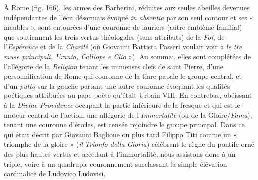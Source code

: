 \documentclass[12pt,twoside,openany]{book}
\begin{document}
À Rome (fig. 166), les armes des Barberini, réduites aux seules abeilles devenues indépendantes de l’écu désormais évoqué \textit{in absentia} par son seul contour et ses « meubles », sont entourées d’une couronne de lauriers (autre emblème familial) que soutiennent les trois vertus théologales (sans attributs) de la \textit{Foi}, de l’\textit{Espérance} et de la \textit{Charité} (où Giovanni Battista Passeri voulait voir « \textit{le tre muse principali, Urania, Calliope e Clio} »). Au sommet, elles sont complétées de l’allégorie de la \textit{Religion} tenant les immenses clefs de saint Pierre, d’une personnification de Rome qui couronne de la tiare papale le groupe central, et d’un \textit{putto} sur la gauche portant une autre couronne évoquant les qualités poétiques attribuées au pape-poète qu’était Urbain VIII. En contrebas, obéissant à la \textit{Divine Providence} occupant la partie inférieure de la fresque et qui est le moteur central de l’action, une allégorie de l’\textit{Immortalité} (ou de la Gloire/\textit{Fama}), tenant une couronne d’étoiles, est censée rejoindre le groupe principal. Dans ce qui était décrit par Giovanni Baglione ou plus tard Filippo Titi comme un « triomphe de la gloire » (\textit{il Trionfo della Gloria}) célébrant le règne du pontife orné des plus hautes vertus et accédant à l’immortalité, nous assistons donc à un triple, voire à un quadruple couronnement surclassant la simple élévation cardinalice de Ludovico Ludovisi.
\end{document}
